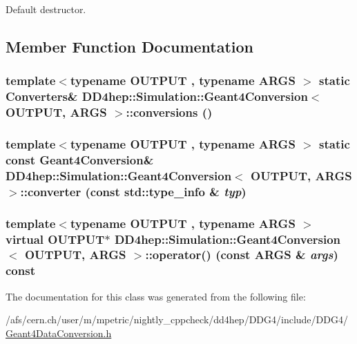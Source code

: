 Default destructor. 

\subsection{Member Function Documentation}
\hypertarget{class_d_d4hep_1_1_simulation_1_1_geant4_conversion_ab9cbccbc85006e7c05a09e89b9b7a93f}{
\subsubsection[{conversions}]{\setlength{\rightskip}{0pt plus 5cm}template$<$typename OUTPUT , typename ARGS $>$ static {\bf Converters}\& {\bf DD4hep::Simulation::Geant4Conversion}$<$ OUTPUT, ARGS $>$::conversions ()}}
\label{class_d_d4hep_1_1_simulation_1_1_geant4_conversion_ab9cbccbc85006e7c05a09e89b9b7a93f}
\hypertarget{class_d_d4hep_1_1_simulation_1_1_geant4_conversion_ae3cf2cfa3d9381220a8865943a496ff5}{
\subsubsection[{converter}]{\setlength{\rightskip}{0pt plus 5cm}template$<$typename OUTPUT , typename ARGS $>$ static const {\bf Geant4Conversion}\& {\bf DD4hep::Simulation::Geant4Conversion}$<$ OUTPUT, ARGS $>$::converter (const std::type\_\-info \& {\em typ})}}
\label{class_d_d4hep_1_1_simulation_1_1_geant4_conversion_ae3cf2cfa3d9381220a8865943a496ff5}
\hypertarget{class_d_d4hep_1_1_simulation_1_1_geant4_conversion_afab79d045509dd073e3c5d435ff84dc2}{
\subsubsection[{operator()}]{\setlength{\rightskip}{0pt plus 5cm}template$<$typename OUTPUT , typename ARGS $>$ virtual OUTPUT$\ast$ {\bf DD4hep::Simulation::Geant4Conversion}$<$ OUTPUT, ARGS $>$::operator() (const ARGS \& {\em args}) const}}
\label{class_d_d4hep_1_1_simulation_1_1_geant4_conversion_afab79d045509dd073e3c5d435ff84dc2}


The documentation for this class was generated from the following file:\begin{DoxyCompactItemize}
\item 
/afs/cern.ch/user/m/mpetric/nightly\_\-cppcheck/dd4hep/DDG4/include/DDG4/\hyperlink{_geant4_data_conversion_8h}{Geant4DataConversion.h}\end{DoxyCompactItemize}
